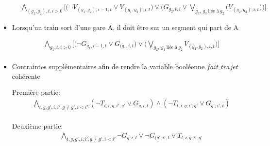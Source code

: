 \documentclass[a4paper]{article}
\begin{document}
\begin{itemize}
\begin{equation*}
    \begin{split}
      & \bigwedge_{(g_1, g_2), t, i > 0}
      \big[
      \big(\neg V_{(g_1, g_2), i-1, t} \lor V_{(g_1, g_2), i, t} \big)
      \lor
      \big(G_{g_2, t, i} \lor \bigvee_{g_3,\ g_3\ \text{liée à}\ g_2} \big(V_{(g_2, g_3), i, t}\big) \big)
      \big]
      \end{split}
    \end{equation*}


\item Lorsqu'un train sort d'une gare A, il doit être sur un segment qui part de A

\begin{equation*}
    \begin{split}
      & \bigwedge_{g_1, t, i > 0}
      \big[
      \big(\neg G_{g_1, i-1, t} \lor G_{(g_1, i, t} \big)
      \lor
      \big(\bigvee_{g_2,\ g_1\ \text{liée à}\ g_2} V_{(g_1, g_2), i, t}\big) 
      \big]\\
    \end{split}
    \end{equation*}
    
\item Contraintes supplémentaires afin de rendre la variable booléenne $fait\_trajet$ cohérente

Première partie: \\
\begin{equation*}
    \begin{split}
      & \bigwedge_{t, g, g', i, i', g \neq g', i < i'}
      (\neg T_{t,i,g,i', g'} \lor G_{g, i, t} ) \land (\neg T_{t,i,g,i', g'} \lor  G_{g', i', t} )\\
    \end{split}
    \end{equation*}

Deuxième partie: \\

\begin{equation*}
    \begin{split}
      & \bigwedge_{t, g, g', i, i', g \neq g', i < i'}
      \neg G_{g, i, t} \lor \neg G_{(g', i', t} \lor T_{t,i,g,i', g'} \\
    \end{split}
    \end{equation*}


\end{itemize}

\end{document}

